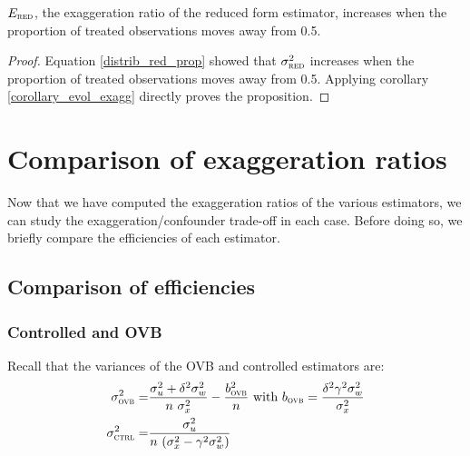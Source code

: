 \documentclass[a4paper, 11pt]{report}
\begin{document}
				\begin{proposition}
					 $E_{\textsc{red}}$, the exaggeration ratio of the reduced form estimator, increases when the proportion of treated observations moves away from 0.5.
				\end{proposition}
				
			\begin{proof}
				Equation \ref{distrib_red_prop} showed that $\sigma_{\textsc{red}}^{2}$ increases when the proportion of treated observations moves away from 0.5. Applying corollary \ref{corollary_evol_exagg} directly proves the proposition.
			\end{proof}
			
			

	\section{Comparison of exaggeration ratios}
	
		Now that we have computed the exaggeration ratios of the various estimators, we can study the exaggeration/confounder trade-off in each case. Before doing so, we briefly compare the efficiencies of each estimator.
		
		
		\subsection{Comparison of efficiencies}\label{efficiencies}
		
			\subsubsection{Controlled and OVB}
		
			Recall that the variances of the OVB and controlled estimators are:
				~
				\begin{align*}
					\sigma_{\textsc{ovb}}^{2}  = &\frac{ \sigma_{u}^{2} +  \delta^{2} \sigma_{w}^{2}}{n \ \sigma_{x}^{2}}  - \frac{b_{\textsc{ovb}}^{2}}{n} \text{ with } b_{\textsc{ovb}} =  \frac{\delta^{2}\gamma^{2}\sigma_{w}^{2}}{\sigma_{x}^{2}}\\
					\sigma_{\textsc{ctrl}}^{2} =  & \frac{\sigma_{u}^{2}}{n \ (\sigma_{x}^{2} - \gamma^{2}\sigma_{w}^{2})}
				\end{align*}
				
\end{document}
